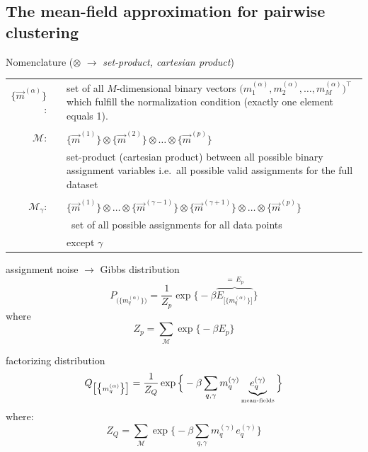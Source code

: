 \begin{frame}
\section{The mean-field approximation for pairwise clustering}
 Nomenclature ($\otimes$ $\rightarrow$ \emph{set-product, cartesian product})\\
 
 \begin{tabular}{r l p{9cm}}
$\big\{ \vec{m}^{(\alpha)} \big\}$: & & set of all $M$-dimensional binary vectors $\big( m_1^{(\alpha)}, m_2^{(\alpha)}, \ldots, 
  m_M^{(\alpha)} \big)^\top$ which fulfill the normalization condition (exactly one element equals 1). \\\\
$\mathscr{M}$: & & $\big\{ \vec{m}^{(1)} \big\} \otimes \big\{ \vec{m}^{(2)} \big\} \otimes \ldots \otimes \big\{ \vec{m}^{(p)} \big\}$\\
& & set-product (cartesian product) between all possible binary assignment variables i.e.\ all possible valid assignments for the full dataset\\\\
$\mathscr{M}_{\gamma}$:& &  $\big\{ \vec{m}^{(1)} \big\} \otimes \ldots \otimes \big\{ \vec{m}^{(\gamma - 1)} \big\} \otimes
  \big\{ \vec{m}^{(\gamma + 1)} \big\} \otimes \ldots \otimes
  \big\{ \vec{m}^{(p)} \big\}$\\
& &\  set of all possible assignments for all data points  \\& & \hspace{0.03cm} except $\gamma$
\end{tabular}

\end{frame}

\begin{frame}[t] 
\begin{block}{assignment noise $\rightarrow$ Gibbs distribution}
$$
	P_{ \big( \big\{ m_q^{(\alpha)} \big\} \big) }
	= \frac{1}{Z_p} \exp \Big\{ -\beta 
	\overbrace{
		E_{\big[ \big\{ m_q^{(\alpha)} \big\} \big]}
		}^{= \, E_p}
		\Big\}
$$
where
$$
	Z_p = \sum\limits_{\mathscr{M}} \exp \Big\{ -\beta
		E_p
		\Big\}
$$
\end{block}
\begin{block}{factorizing distribution}
$$
	Q_{ \big[ \big\{ m_q^{(\alpha)} \big\} \big] }
	= \frac{1}{Z_Q} \exp \Big\{ -\beta \sum\limits_{q, \gamma}
		m_q^{(\gamma)} \underbrace{ e_q^{(\gamma)} }_{
			\text{{\tiny mean-fields}} } \Big\}
$$
where:
$$
	Z_Q = \sum\limits_{\mathscr{M}} \exp \Big\{ -\beta \sum\limits_{q, 
		\gamma} m_q^{(\gamma)} e_q^{(\gamma)} \Big\}
$$
\end{block}
\end{frame}

